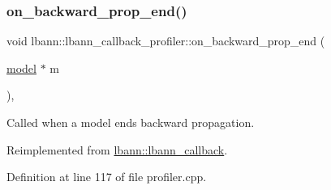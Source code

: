 \subsubsection{\texorpdfstring{on\+\_\+backward\+\_\+prop\+\_\+end()}{on\_backward\_prop\_end()}\hspace{0.1cm}{\footnotesize\ttfamily [1/2]}}
{\footnotesize\ttfamily void lbann\+::lbann\+\_\+callback\+\_\+profiler\+::on\+\_\+backward\+\_\+prop\+\_\+end (\begin{DoxyParamCaption}\item[{\hyperlink{classlbann_1_1model}{model} $\ast$}]{m }\end{DoxyParamCaption})\hspace{0.3cm}{\ttfamily [override]}, {\ttfamily [virtual]}}

Called when a model ends backward propagation. 

Reimplemented from \hyperlink{classlbann_1_1lbann__callback_af183624e63ba65e0003fa988f53dee0c}{lbann\+::lbann\+\_\+callback}.



Definition at line 117 of file profiler.\+cpp.


